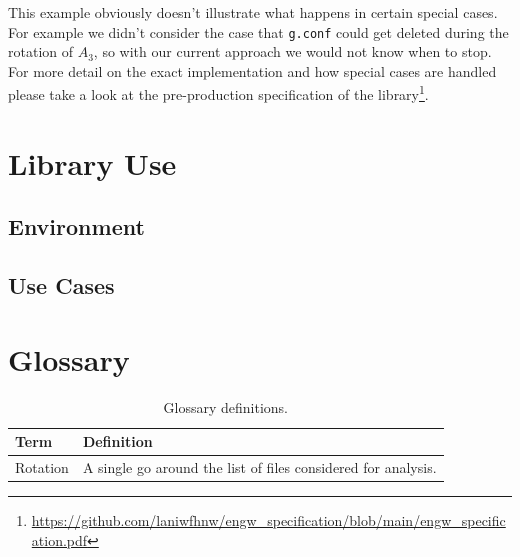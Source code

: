 \documentclass[11pt]{article} %
\begin{document}
  This example obviously doesn't illustrate what happens in certain special cases. For example we didn't consider the case that \texttt{g.conf} could get deleted during the rotation of $A_3$, so with our current approach we would not know when to stop. For more detail on the exact implementation and how special cases are handled please take a look at the pre-production specification of the library\footnote{\url{https://github.com/laniwfhnw/engw_specification/blob/main/engw_specification.pdf}}.



  \section{Library Use}\label{sec:3}



  \subsection{Environment}\label{sec:3.1}



  \subsection{Use Cases}\label{sec:3.2}




  \newpage



  \section{Glossary}

  \begin{table}[H]
    \centering
    \begin{tabular}{p{.3\linewidth} | p{.6\linewidth}}
      \textbf{Term} & \textbf{Definition}
      \\\hline
      Rotation      & A single go around the list of files considered for analysis.
    \end{tabular}
    \caption{Glossary definitions.}
    \label{tab:glossary}
  \end{table}

  \printbibliography[heading=bibintoc]
  \listoffigures
  \listoftables
\end{document}
